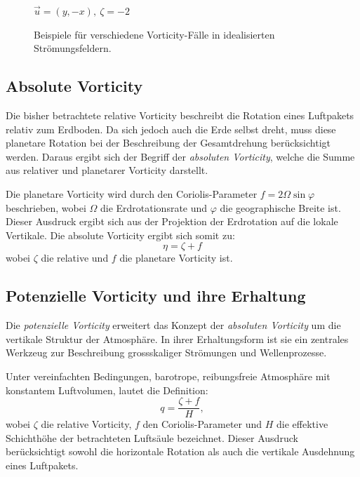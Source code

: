 \begin{figure}
\begin{minipage}{0.32\linewidth}
		{\small \( \vec{u} = (y,-x),\ \zeta = -2\)}
	\end{minipage}

	\caption{Beispiele für verschiedene Vorticity-Fälle in idealisierten Strömungsfeldern.}
	\label{fig:vorticity_examples}
\end{figure}

\subsection{Absolute Vorticity}

Die bisher betrachtete relative Vorticity beschreibt die Rotation eines
Luftpakets relativ zum Erdboden. Da sich jedoch auch die Erde selbst dreht,
muss diese planetare Rotation bei der Beschreibung der Gesamtdrehung
berücksichtigt werden. Daraus ergibt sich der Begriff der \emph{absoluten
	Vorticity}, welche die Summe aus relativer und planetarer Vorticity darstellt.
%

Die planetare Vorticity wird durch den Coriolis-Parameter \(
f = 2 \Omega \sin \varphi \) beschrieben, wobei \( \Omega \) die
Erdrotationsrate und \( \varphi \) die geographische Breite ist. Dieser
Ausdruck ergibt sich aus der Projektion der Erdrotation auf die lokale
Vertikale. Die absolute Vorticity ergibt sich somit zu:
\begin{equation}
	\eta = \zeta + f
	\label{rossby:eq:absolute_vorticity}
\end{equation}
wobei \( \zeta \) die relative und \( f \) die planetare Vorticity ist.


\subsection{Potenzielle Vorticity und ihre Erhaltung}

Die \emph{potenzielle Vorticity} erweitert das Konzept der \emph{absoluten
Vorticity} um die vertikale Struktur der Atmosphäre. In ihrer Erhaltungsform
ist sie ein zentrales Werkzeug zur Beschreibung grossskaliger Strömungen und
Wellenprozesse.

Unter vereinfachten Bedingungen, barotrope, reibungsfreie Atmosphäre mit
konstantem Luftvolumen, lautet die Definition:
\begin{equation}
	q = \frac{\zeta + f}{H},
	\label{rossby:eq:potential_vorticity}
\end{equation}
wobei \(\zeta\) die relative Vorticity, \(f\) den Coriolis-Parameter und \(H\) die effektive Schichthöhe der betrachteten Luftsäule bezeichnet.
Dieser Ausdruck berücksichtigt sowohl die horizontale Rotation als auch die vertikale Ausdehnung eines Luftpakets. 


